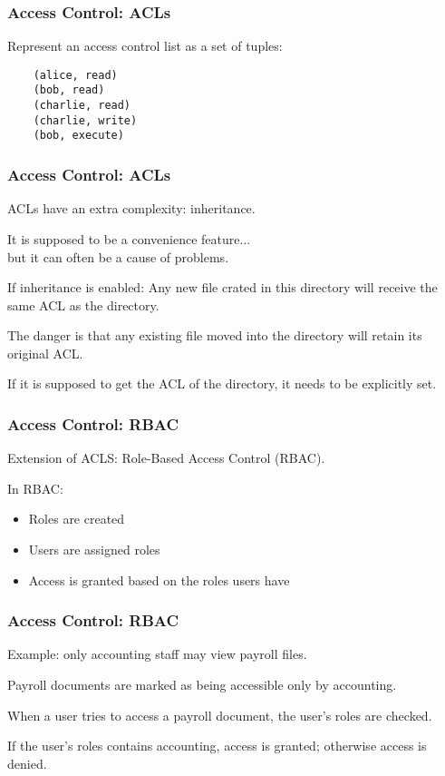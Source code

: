 \begin{frame}[fragile]
\frametitle{Access Control: ACLs}
\begin{changemargin}{1cm}

Represent an access control list as a set of tuples:
\begin{verbatim}
	(alice, read)
	(bob, read)
	(charlie, read)
	(charlie, write)
	(bob, execute)
\end{verbatim}

\end{changemargin}
\end{frame}

\begin{frame}
\frametitle{Access Control: ACLs}
\begin{changemargin}{1cm}

ACLs have an extra complexity: inheritance.

It is supposed to be a convenience feature...\\
\quad but it can often be a cause of problems.

If inheritance is enabled: 
Any new file crated in this directory will receive the same ACL as the directory.

The danger is that any existing file moved into the directory will retain its original ACL. 

If it is supposed to get the ACL of the directory, it needs to be explicitly set.

\end{changemargin}
\end{frame}


\begin{frame}
\frametitle{Access Control: RBAC}
\begin{changemargin}{1cm}

Extension of ACLS: Role-Based Access Control (RBAC).

In RBAC:

\begin{itemize}
	\item Roles are created
	\item Users are assigned roles
	\item Access is granted based on the roles users have
\end{itemize}

\end{changemargin}
\end{frame}

\begin{frame}
\frametitle{Access Control: RBAC}
\begin{changemargin}{1cm}

Example: only accounting staff may view payroll files.

Payroll documents are marked as being accessible only by accounting. 

When a user tries to access a payroll document, the user's roles are checked. 

If the user's roles contains accounting, access is granted; otherwise access is denied.

\end{changemargin}
\end{frame}

